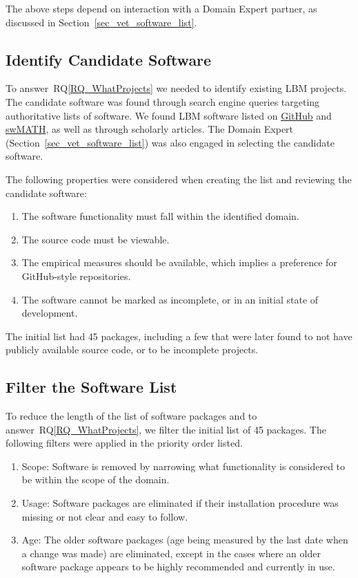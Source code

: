 \documentclass[final, 3p, times, authoryear]{elsarticle}
\newcommand{\rqref}[1]{RQ\ref{#1}}
\begin{document}
\noindent The above steps depend on interaction with a Domain Expert partner, as
discussed in Section~\ref{sec_vet_software_list}.

\subsection{Identify Candidate Software} \label{identifysoftware}

To answer~\rqref{RQ_WhatProjects} we needed to identify existing LBM projects.
The candidate software was found through search engine queries targeting
authoritative lists of software. We found LBM software listed on
\href{https://github.com/} {GitHub} and \href{https://swmath.org/} {swMATH}, as
well as through scholarly articles. The Domain Expert
(Section~\ref{sec_vet_software_list}) was also engaged in selecting the
candidate software.

The following properties were considered when creating the list and reviewing
the candidate software:

\begin{enumerate}
	\item The software functionality must fall within the identified domain.
	\item The source code must be viewable.
	\item The empirical measures should be available, which implies a preference
	for GitHub-style repositories.
	\item The software cannot be marked as incomplete, or in an initial state of
	development.
\end{enumerate}

The initial list had 45 packages, including a few that were later found to not
have publicly available source code, or to be incomplete projects.

\subsection{Filter the Software List} \label{filtersoftware}

To reduce the length of the list of software packages and to
answer~\rqref{RQ_WhatProjects}, we filter the initial list of 45 packages.  The following filters were applied in the priority order listed.

\begin{enumerate}
	\item Scope: Software is removed by narrowing what functionality is
	considered to be within the scope of the domain.
	\item Usage: Software packages are eliminated if their installation
	procedure was missing or not clear and easy to follow.
	\item Age: The older software packages (age being measured by the last date
	when a change was made) are eliminated, except in the cases where an older
	software package appears to be highly recommended and currently in use. 
\end{enumerate}
\end{document}
